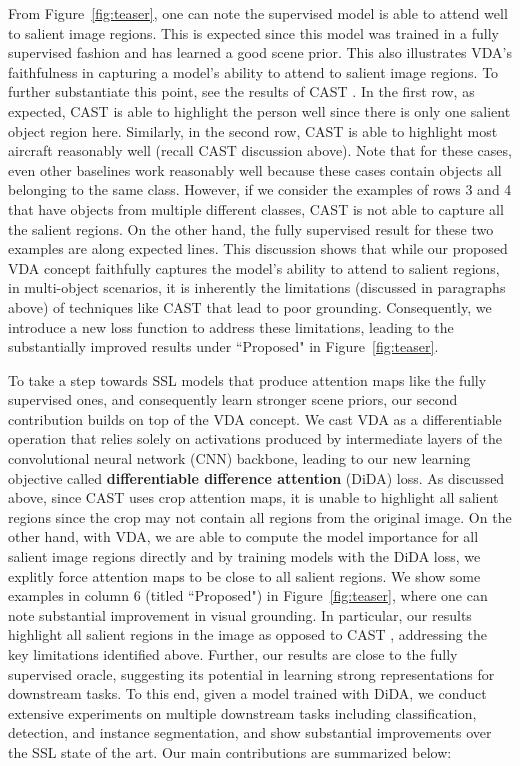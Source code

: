 \documentclass[10pt,twocolumn,letterpaper]{article}
\begin{document}
From Figure~\ref{fig:teaser}, one can note the supervised model is able to attend well to salient image regions. This is expected since this model was trained in a fully supervised fashion and has learned a good scene prior. This also illustrates VDA's faithfulness in capturing a model's ability to attend to salient image regions. To further substantiate this point, see the results of CAST \cite{selvaraju2021casting}. In the first row, as expected, CAST is able to highlight the person well since there is only one salient object region here. Similarly, in the second row, CAST is able to highlight most aircraft reasonably well (recall CAST discussion above). Note that for these cases, even other baselines \cite{chen2020simple,he2020momentum} work reasonably well because these cases contain objects all belonging to the same class. However, if we consider the examples of rows 3 and 4 that have objects from multiple different classes, CAST is not able to capture all the salient regions. On the other hand, the fully supervised result for these two examples are along expected lines. This discussion shows that while our proposed VDA concept faithfully captures the model's ability to attend to salient regions, in multi-object scenarios, it is inherently the limitations (discussed in paragraphs above) of techniques like CAST \cite{selvaraju2021casting} that lead to poor grounding. Consequently, we introduce a new loss function to address these limitations, leading to the substantially improved results under ``Proposed" in Figure~\ref{fig:teaser}.

To take a step towards SSL models that produce attention maps like the fully supervised ones, and consequently learn stronger scene priors, our second contribution builds on top of the VDA concept. We cast VDA as a differentiable operation that relies solely on activations produced by intermediate layers of the convolutional neural network (CNN) backbone, leading to our new learning objective called \textbf{differentiable difference attention} (DiDA) loss. As discussed above, since CAST \cite{selvaraju2021casting} uses crop attention maps, it is unable to highlight all salient regions since the crop may not contain all regions from the original image. On the other hand, with VDA, we are able to compute the model importance for all salient image regions directly and by training models with the DiDA loss, we explitly force attention maps to be close to all salient regions. We show some examples in column 6 (titled ``Proposed") in Figure~\ref{fig:teaser}, where one can note substantial improvement in visual grounding. In particular, our results highlight all salient regions in the image as opposed to CAST \cite{selvaraju2021casting}, addressing the key limitations identified above. Further, our results are close to the fully supervised oracle, suggesting its potential in learning strong representations for downstream tasks. To this end, given a model trained with DiDA, we conduct extensive experiments on multiple downstream tasks including classification, detection, and instance segmentation, and show substantial improvements over the SSL state of the art. 
Our main contributions are summarized below:
\end{document}

